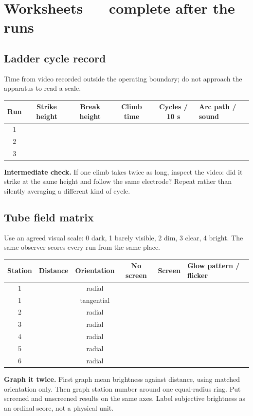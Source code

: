 \section{Worksheets --- complete after the runs}
\subsection*{Ladder cycle record}
Time from video recorded outside the operating boundary; do not approach the
apparatus to read a scale.
\begin{center}\small
\begin{tabularx}{.95\linewidth}{@{}c c c c c X@{}}
\toprule
\textbf{Run} & \textbf{Strike height} & \textbf{Break height} &
\textbf{Climb time} & \textbf{Cycles / 10 s} & \textbf{Arc path / sound}\\
\midrule
1 & & & & &\\[.65em]
2 & & & & &\\[.65em]
3 & & & & &\\
\bottomrule
\end{tabularx}
\end{center}

\textbf{Intermediate check.} If one climb takes twice as long, inspect the video:
did it strike at the same height and follow the same electrode? Repeat rather
than silently averaging a different kind of cycle.

\subsection*{Tube field matrix}
Use an agreed visual scale: 0 dark, 1 barely visible, 2 dim, 3 clear, 4 bright.
The same observer scores every run from the same place.
\begin{center}\small
\begin{tabularx}{.95\linewidth}{@{}c c c c c X@{}}
\toprule
\textbf{Station} & \textbf{Distance} & \textbf{Orientation} &
\textbf{No screen} & \textbf{Screen} & \textbf{Glow pattern / flicker}\\
\midrule
1 & & radial & & &\\[.60em]
1 & & tangential & & &\\[.60em]
2 & & radial & & &\\[.60em]
3 & & radial & & &\\[.60em]
4 & & radial & & &\\[.60em]
5 & & radial & & &\\[.60em]
6 & & radial & & &\\
\bottomrule
\end{tabularx}
\end{center}

\textbf{Graph it twice.} First graph mean brightness against distance, using
matched orientation only. Then graph station number around one equal-radius
ring. Put screened and unscreened results on the same axes. Label subjective
brightness as an ordinal score, not a physical unit.
\endgroup

